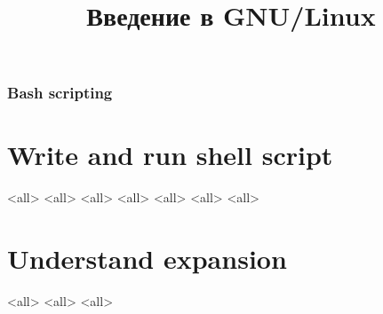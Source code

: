 

\title{Введение в GNU/Linux}




\begin{frame}
	\frametitle{Bash scripting}
	\titlepage
	\vspace{-0.5cm}
	\begin{center}
	\end{center}
\end{frame}


\begin{frame}
	\tableofcontents
	[hideallsubsections]
\end{frame}


\section{Write and run shell script}
\mode<all>{}
\mode<all>{}
\mode<all>{}
\mode<all>{}
\mode<all>{}
\mode<all>{}
\mode<all>{}



\section{Understand expansion}
\mode<all>{}
\mode<all>{}
\mode<all>{}

